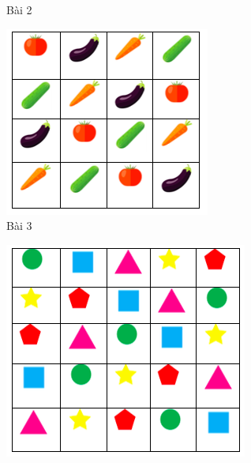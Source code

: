 \begin{multicols}{2}
\begin{figure}[H]
		\caption{\small{Bài 2}}
		\vspace*{-10pt}
	\end{figure}
	\begin{figure}[H]
		\centering
		\vspace*{-5pt}
		\captionsetup{labelformat= empty, justification=centering}
		\includegraphics[width=0.9\linewidth]{sudoku3.png}
		\caption{\small{Bài 3}}
		\vspace*{-10pt}
	\end{figure}
	\begin{figure}[H]
		\centering
		\vspace*{-5pt}
		\captionsetup{labelformat= empty, justification=centering}
		\includegraphics[width=0.9\linewidth]{sudoku4.png}

\end{figure}
\end{multicols}
